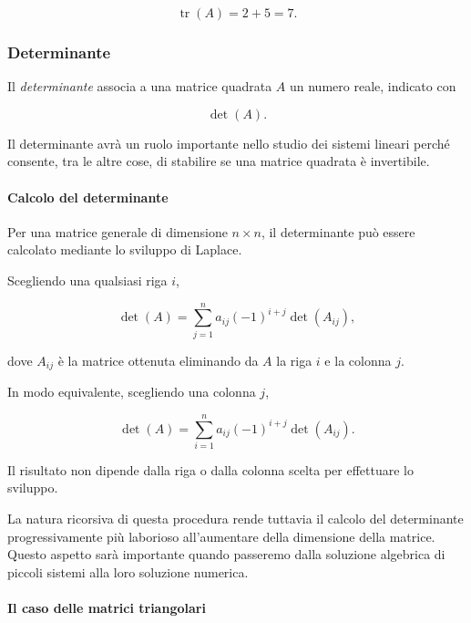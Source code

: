 \begin{equation*}
\operatorname{tr}(A)=2+5=7.
\end{equation*}


\subsubsection{Determinante}

Il \emph{determinante} associa a una matrice quadrata $A$ un
numero reale, indicato con

\begin{equation*}
\det(A).
\end{equation*}

Il determinante avrà un ruolo importante nello studio dei sistemi
lineari perché consente, tra le altre cose, di stabilire se una
matrice quadrata è invertibile.


\paragraph{Calcolo del determinante}

Per una matrice generale di dimensione $n\times n$, il determinante
può essere calcolato mediante lo sviluppo di Laplace.

Scegliendo una qualsiasi riga $i$,

\begin{equation*}
\det(A)
=
\sum_{j=1}^{n}
a_{ij}(-1)^{i+j}\det(A_{ij}),
\label{eq:laplace_riga}
\end{equation*}

dove $A_{ij}$ è la matrice ottenuta eliminando da $A$ la riga $i$
e la colonna $j$.

In modo equivalente, scegliendo una colonna $j$,

\begin{equation*}
\det(A)
=
\sum_{i=1}^{n}
a_{ij}(-1)^{i+j}\det(A_{ij}).
\label{eq:laplace_colonna}
\end{equation*}

Il risultato non dipende dalla riga o dalla colonna scelta per
effettuare lo sviluppo.

La natura ricorsiva di questa procedura rende tuttavia il calcolo
del determinante progressivamente più laborioso all'aumentare
della dimensione della matrice. Questo aspetto sarà importante
quando passeremo dalla soluzione algebrica di piccoli sistemi
alla loro soluzione numerica.


\paragraph{Il caso delle matrici triangolari}

